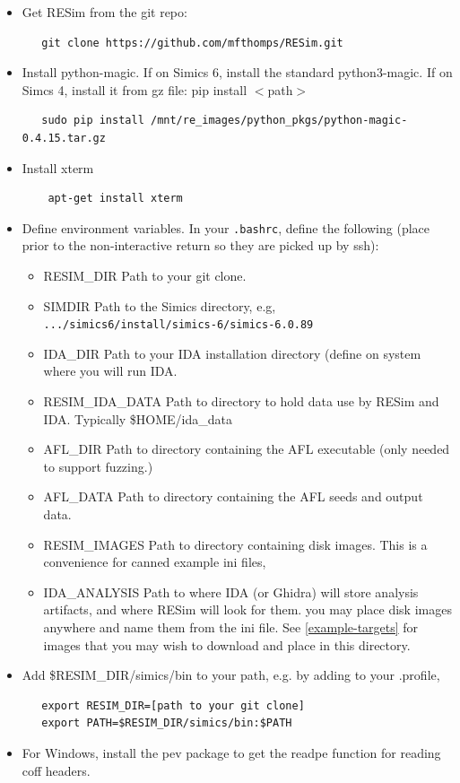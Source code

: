 \documentclass[titlepage]{article}
\begin{document}
\begin{itemize}
\item Get RESim from the git repo:
\begin{verbatim}
   git clone https://github.com/mfthomps/RESim.git
\end{verbatim}
\item Install python-magic.  If on Simics 6, install the standard python3-magic.  If on Simcs 4, install it from gz file:  pip install $<$path$>$
\begin{verbatim}
   sudo pip install /mnt/re_images/python_pkgs/python-magic-0.4.15.tar.gz
\end{verbatim}
\item Install xterm
\begin{verbatim}
    apt-get install xterm
\end{verbatim}
\item Define environment variables.  In your {\tt .bashrc}, define the following (place prior to the 
non-interactive return so they are picked up by ssh):
\begin{itemize}
\item RESIM\_DIR  Path to your git clone.
\item SIMDIR  Path to the Simics directory, e.g, {\tt .../simics6/install/simics-6/simics-6.0.89}
\item IDA\_DIR Path to your IDA installation directory (define on system where you will run IDA.
\item RESIM\_IDA\_DATA Path to directory to hold data use by RESim and IDA.  Typically \$HOME/ida\_data
\item AFL\_DIR Path to directory containing the AFL executable (only needed to support fuzzing.)
\item AFL\_DATA Path to directory containing the AFL seeds and output data.
\item RESIM\_IMAGES Path to directory containing disk images.  This is a convenience for canned example ini files,
\item IDA\_ANALYSIS Path to where IDA (or Ghidra) will store analysis artifacts, and where RESim will look for them.
you may place disk images anywhere and name them from the ini file.  See \ref{example-targets} for images that you may
wish to download and place in this directory.
\end{itemize}
\item Add \$RESIM\_DIR/simics/bin to your path, e.g. by adding to your .profile,
\begin{verbatim}
   export RESIM_DIR=[path to your git clone]
   export PATH=$RESIM_DIR/simics/bin:$PATH
\end{verbatim}

\item For Windows, install the pev package to get the readpe function for reading coff headers.
\end{itemize}
\end{document}
